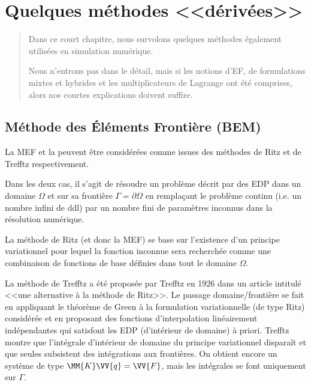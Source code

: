 \chapter{Quelques méthodes <<dérivées>>}\label{Ch-XFEM}
\begin{abstract}
Dans ce court chapitre, nous survolons quelques méthodes également utilisées
en simulation numérique.

Nous n'entrons pas dans le détail, mais si les notions d'EF, de formulations
mixtes et hybrides et les multiplicateurs de Lagrange ont été comprises, alors nos courtes
explications doivent suffire.
\end{abstract}


\medskip
\section{Méthode des Éléments Frontière (BEM)}\label{Sec-BEM}

La MEF et la  
peuvent être
considérées comme issues des méthodes de Ritz 
et de Trefftz respectivement.

Dans les deux cas, il s'agit de résoudre un problème décrit par des EDP dans un
domaine $\Omega$ et sur sa frontière $\Gamma=\partial\Omega$ en remplaçant
le problème continu (i.e. un nombre infini de ddl) par un nombre fini de paramètres inconnus 
dans la résolution numérique.

\medskip
La méthode de Ritz (et donc la MEF) se base sur 
l'existence d'un principe variationnel pour lequel la fonction inconnue sera recherchée comme une 
combinaison de fonctions de base définies dans tout le domaine $\Omega$.

\medskip
La méthode de Trefftz a été proposée 
par Trefftz en 1926 dans un article intitulé <<une alternative à la méthode de Ritz>>. 
Le passage domaine/frontière se fait en appliquant le théorème de Green 
à la formulation variationnelle (de type Ritz) 
considérée et en proposant des fonctions d'interpolation linéairement indépendantes
qui satisfont les EDP (d'intérieur de domaine) à priori.
Trefftz montre que l'intégrale d'intérieur de domaine du principe variationnel disparaît et que
seules subsistent des intégrations aux frontières. 
On obtient encore un système de type $\MM{K}\VV{q}=\VV{F}$, mais les intégrales se font uniquement
sur $\Gamma$.

